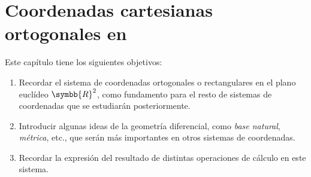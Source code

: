 %


\chapter{Coordenadas cartesianas ortogonales en\/
  }
Este capítulo tiene los siguientes objetivos:
\begin{enumerate}
\item Recordar el sistema de coordenadas ortogonales o rectangulares en el
  plano euclídeo $\symbb{R}^2$, como fundamento para el resto de sistemas de
  coordenadas que se estudiarán posteriormente.
\item Introducir algunas ideas de la geometría diferencial, como
  \emph{base natural}, \emph{métrica}, etc., que serán más importantes en otros
  sistemas de coordenadas.
\item Recordar la expresión del resultado de distintas operaciones de cálculo en
  este sistema.
\end{enumerate}

